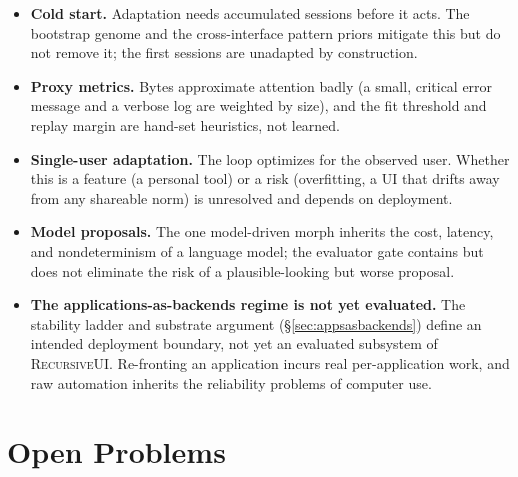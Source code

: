 \documentclass[11pt]{article}
\begin{document}
\begin{itemize}[leftmargin=1.4em,itemsep=2pt]
  \item \textbf{Cold start.} Adaptation needs accumulated sessions before it acts.
  The bootstrap genome and the cross-interface pattern priors mitigate this but do
  not remove it; the first sessions are unadapted by construction.
  \item \textbf{Proxy metrics.} Bytes approximate attention badly (a small,
  critical error message and a verbose log are weighted by size), and the fit
  threshold and replay margin are hand-set heuristics, not learned.
  \item \textbf{Single-user adaptation.} The loop optimizes for the observed user.
  Whether this is a feature (a personal tool) or a risk (overfitting, a UI that
  drifts away from any shareable norm) is unresolved and depends on deployment.
  \item \textbf{Model proposals.} The one model-driven morph inherits the cost,
  latency, and nondeterminism of a language model; the evaluator gate contains but
  does not eliminate the risk of a plausible-looking but worse proposal.
  \item \textbf{The applications-as-backends regime is not yet evaluated.}
  The stability ladder and substrate argument (\S\ref{sec:appsasbackends}) define
  an intended deployment boundary, not yet an evaluated subsystem of
  \textsc{RecursiveUI}. Re-fronting an application incurs real per-application
  work, and raw automation inherits the reliability problems of computer use.
\end{itemize}

\section{Open Problems}
\label{sec:open}
\end{document}
